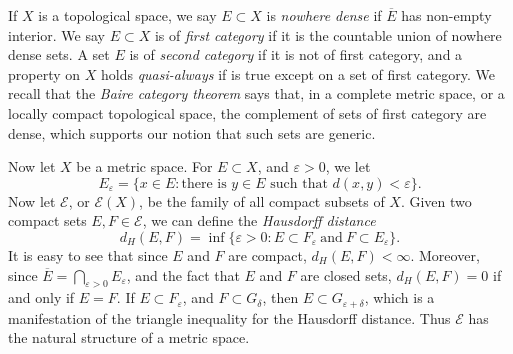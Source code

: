If $X$ is a topological space, we say $E \subset X$ is \emph{nowhere dense} if $\overline{E}$ has non-empty interior. We say $E \subset X$ is of \emph{first category} if it is the countable union of nowhere dense sets. A set $E$ is of \emph{second category} if it is not of first category, and a property on $X$ holds \emph{quasi-always} if is true except on a set of first category. We recall that the \emph{Baire category theorem} says that, in a complete metric space, or a locally compact topological space, the complement of sets of first category are dense, which supports our notion that such sets are generic.

Now let $X$ be a metric space. For $E \subset X$, and $\varepsilon > 0$, we let
%
\[ E_\varepsilon = \{ x \in E: \text{there is $y \in E$ such that $d(x,y) < \varepsilon$} \}. \]
%
Now let $\mathcal{E}$, or $\mathcal{E}(X)$, be the family of all compact subsets of $X$. Given two compact sets $E, F \in \mathcal{E}$, we can define the \emph{Hausdorff distance}
%
\[ d_H(E,F) = \inf \{ \varepsilon > 0: E \subset F_\varepsilon\ \text{and}\ F \subset E_\varepsilon \}. \]
%
It is easy to see that since $E$ and $F$ are compact, $d_H(E,F) < \infty$. Moreover, since $\overline{E} = \bigcap_{\varepsilon > 0} E_\varepsilon$, and the fact that $E$ and $F$ are closed sets, $d_H(E,F) = 0$ if and only if $E = F$. If $E \subset F_\varepsilon$, and $F \subset G_\delta$, then $E \subset G_{\varepsilon + \delta}$, which is a manifestation of the triangle inequality for the Hausdorff distance. Thus $\mathcal{E}$ has the natural structure of a metric space.

